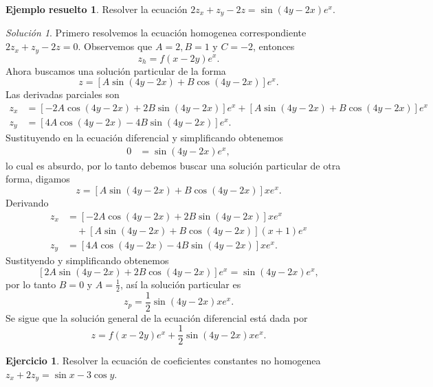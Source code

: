 \documentclass[11pt,letterpaper,draft]{report}
\theoremstyle{plain}
\theoremstyle{definition}
\newtheorem{solved}[theorem]{Ejemplo resuelto}
\newtheorem{exercise}[theorem]{Ejercicio}
\theoremstyle{remark}
\newtheorem*{solution}{Solución}
\newcommand\<{\langle}
\renewcommand\>{\rangle}
\begin{document}
\begin{solved}
  Resolver la ecuación $2z_x + z_y - 2z = \sin(4y-2x)e^{x}$.

  \begin{solution}
    Primero resolvemos la ecuación homogenea correspondiente
    $2z_x + z_y - 2z = 0$. Observemos que $A = 2, B = 1$ y
    $C = -2$, entonces
     \[
      z_h = f(x-2y)e^{x}
    .\] 
    Ahora buscamos una solución particular de la forma
    \[
      z = [A \sin(4y-2x) + B \cos(4y-2x)]e^{x}
    .\] Las derivadas parciales son
    \begin{align*}
      z_x &= [-2A\cos(4y-2x) + 2B\sin(4y-2x)]e^{x} +
      [A\sin(4y-2x) + B\cos(4y-2x)]e^{x}\\
      z_y &= [4A\cos(4y-2x) - 4B\sin(4y-2x)]e^{x}.
    \end{align*}
    Sustituyendo en la ecuación diferencial y simplificando
    obtenemos
    \begin{align*}
      0 &= \sin(4y-2x)e^{x},
    \end{align*}
    lo cual es absurdo, por lo tanto debemos buscar una
    solución particular de otra forma, digamos
    \[
    z = [A\sin(4y-2x) + B\cos(4y-2x)]x e^{x}
    .\] Derivando
    \begin{align*}
      z_x &= [-2A\cos(4y-2x) + 2B\sin(4y-2x)]xe^{x}\\
          &\quad+ [A\sin(4y-2x)+B\cos(4y-2x)](x+1)e^{x}\\
      z_y &= [4A\cos(4y-2x) - 4B\sin(4y-2x)]xe^{x}.
    \end{align*}
    Sustityendo y simplificando obtenemos
    \[
      [2A\sin(4y-2x) + 2B\cos(4y-2x)]e^{x} = \sin(4y-2x)e^{x}
    ,\] 
    por lo tanto $B = 0$ y $A = \frac{1}{2}$, así la
    solución particular es
    \[
    z_p = \frac{1}{2}\sin(4y-2x)xe^{x}
    .\]
    Se sigue que la solución general de la ecuación
    diferencial está dada por
    \[
    z = f(x-2y)e^{x} + \frac{1}{2}\sin(4y-2x)xe^{x}
    .\] 
  \end{solution}
\end{solved}

\begin{exercise}
  Resolver la ecuación de coeficientes constantes no
  homogenea $z_x + 2 z_y = \sin x - 3 \cos y$.
\end{exercise}
\end{document}
